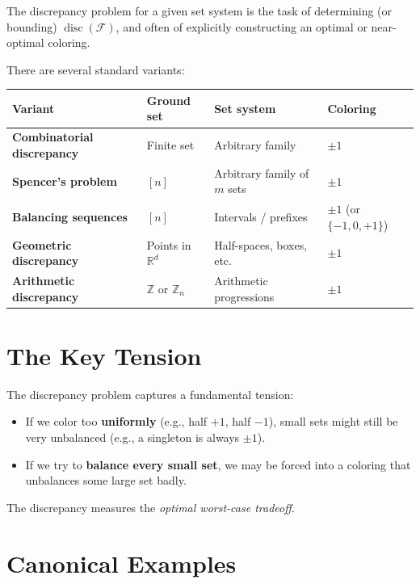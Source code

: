 \documentclass[11pt]{article}
\DeclareMathOperator{\disc}{disc}
\begin{document}
The discrepancy problem for a given set system is the task of
determining (or bounding) \(\disc(\mathcal{F})\), and often of
explicitly constructing an optimal or near-optimal coloring.

There are several standard variants:

\begin{center}
\begin{tabular}{llll}
\toprule
\textbf{Variant} & \textbf{Ground set} & \textbf{Set system} & \textbf{Coloring} \\
\midrule
\textbf{Combinatorial discrepancy} & Finite set & Arbitrary family & \(\pm 1\) \\
\textbf{Spencer's problem} & \([n]\) & Arbitrary family of \(m\) sets & \(\pm 1\) \\
\textbf{Balancing sequences} & \([n]\) & Intervals / prefixes & \(\pm 1\) (or \(\{-1,0,+1\}\)) \\
\textbf{Geometric discrepancy} & Points in \(\mathbb{R}^d\) & Half-spaces, boxes, etc. & \(\pm 1\) \\
\textbf{Arithmetic discrepancy} & \(\mathbb{Z}\) or \(\mathbb{Z}_n\) & Arithmetic progressions & \(\pm 1\) \\
\bottomrule
\end{tabular}
\end{center}

\hrulefill

\section{The Key Tension}

The discrepancy problem captures a fundamental tension:

\begin{itemize}
  \item If we color too \textbf{uniformly} (e.g., half \(+1\), half
        \(-1\)), small sets might still be very unbalanced (e.g., a
        singleton is always \(\pm 1\)).
  \item If we try to \textbf{balance every small set}, we may be forced
        into a coloring that unbalances some large set badly.
\end{itemize}

The discrepancy measures the \emph{optimal worst-case tradeoff}.

\hrulefill

\section{Canonical Examples}
\end{document}
